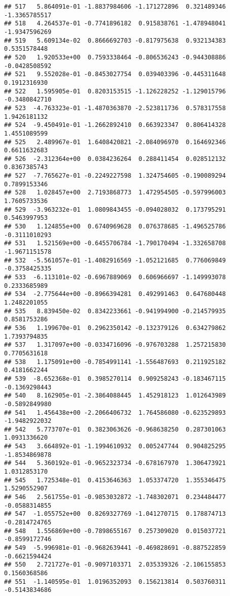 \documentclass[
]{article}
\begin{document}
\begin{verbatim}
## 517   5.864091e-01 -1.8837984606 -1.171272896  0.321489346 -1.3365785517
## 518   4.264537e-01 -0.7741896182  0.915838761 -1.478948041 -1.9347596269
## 519   5.609134e-02  0.8666692703 -0.817975638  0.932134383  0.5351578448
## 520   1.920533e+00  0.7593338464 -0.806536243 -0.944308886 -0.0428508592
## 521   9.552028e-01 -0.8453027754  0.039403396 -0.445311648  0.1912316930
## 522   1.595905e-01  0.8203153515 -1.126228252 -1.129015796 -0.3480842710
## 523  -4.763323e-01 -1.4870363870 -2.523811736  0.578317558  1.9426181132
## 524  -9.450491e-01 -1.2662892410  0.663923347  0.806414328  1.4551089599
## 525   2.489967e-01  1.6408420821 -2.084096970  0.164692346  0.6611632683
## 526  -2.312364e+00  0.0384236264  0.288411454  0.028512132  0.8367385743
## 527  -7.765627e-01 -0.2249227598  1.324754605 -0.190089294  0.7899153346
## 528   1.028457e+00  2.7193868773  1.472954505 -0.597996003  1.7605733536
## 529  -3.963232e-01  1.0809843455 -0.094028032  0.173795291  0.5463997953
## 530   1.124855e+00  0.6740969628  0.076378685 -1.496525786 -0.3111010293
## 531   1.521569e+00 -0.6455706784 -1.790170494 -1.332658708 -1.9671151578
## 532  -5.561057e-01 -1.4082916569 -1.052121685  0.776069849 -0.3758425335
## 533  -6.113101e-02 -0.6967889069  0.606966697 -1.149993078  0.2333685989
## 534  -2.775644e+00 -0.8966394281  0.492991463  0.647680448  1.2482201055
## 535   8.839450e-02  0.8342233661 -0.941994900 -0.214579935  0.8581753286
## 536   1.199670e-01  0.2962350142 -0.132379126  0.634279862  1.7393794835
## 537   1.317097e+00 -0.0334716096 -0.976703288  1.257215830  0.7705631618
## 538   1.175091e+00 -0.7854991141 -1.556487693  0.211925182  0.4181662244
## 539  -8.652368e-01  0.3985270114  0.909258243 -0.183467115 -0.1369298443
## 540   8.162905e-01 -2.3864088445  1.452918123  1.012643989 -0.5892849980
## 541   1.456438e+00 -2.2066406732  1.764586080 -0.623529893 -1.9482922032
## 542   5.773707e-01  0.3823063626 -0.968638250  0.287301063  1.0931336620
## 543   3.664892e-01 -1.1994610932  0.005247744  0.904825295 -1.8534869878
## 544   5.360192e-01 -0.9652323734 -0.678167970  1.306473921  1.0312853170
## 545   1.725348e-01  0.4153646363  1.053374720  1.355346475  1.5290552907
## 546   2.561755e-01 -0.9853032872 -1.748302071  0.234484477 -0.0588314855
## 547  -1.055752e+00  0.8269327769 -1.041270715  0.178874713 -0.2814724765
## 548   1.556869e+00 -0.7898655167  0.257309020  0.015037721 -0.8599172746
## 549  -5.996981e-01 -0.9682639441 -0.469828691 -0.887522859 -0.6621594424
## 550   2.721727e-01 -0.9097103371  2.035339326 -2.106155853  0.1560368586
## 551  -1.140595e-01  1.0196352093  0.156213814  0.503760311 -0.5143834686

\end{verbatim}
\end{document}

